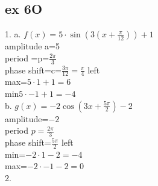 \documentclass{article}
\begin{document}
  \subsection{ex 6O}
  1. a. $f(x)=5\cdot\sin(3(x+\frac{\pi}{12}))+1$\\
  amplitude a=5\\
  period =p=$\frac{2\pi}{3}$\\
  phase shift=c=$\frac{3\pi}{12}=\frac{\pi}{4}$ left\\
  max=$5\cdot1+1=6$\\
  min$5\cdot-1+1=-4$\\
  b. $g(x)=-2\cos(3x+\frac{5\pi}{2})-2$\\
  amplitude=$-2$\\
  period $p=\frac{2\pi}{3}$\\
  phase shift=$\frac{5\pi}{2}$ left\\
  min=$-2\cdot1-2=-4$\\
  max=$-2\cdot-1-2=0$\\
  2.


   
\end{document}
